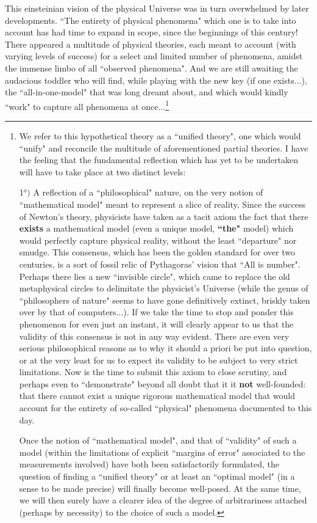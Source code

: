 This einsteinian vision of the physical Universe was in turn overwhelmed by later developments. ``The entirety of physical phenomena" which one is to take into account has had time to expand in scope, since the beginnings of this century! There appeared a multitude of physical theories, each meant to account (with varying levels of success) for a select and limited number of phenomena, amidst the immense limbo of all ``observed phenomena". And we are still awaiting the audacious toddler who will find, while playing with the new key (if one exists...), the ``all-in-one-model" that was long dreamt about, and which would kindly ``work" to capture all phenomena at once...\footnote{We refer to this hypothetical theory as a ``unified theory", one which would ``unify" and reconcile the multitude of aforementioned partial theories. I have the feeling that the fundamental reflection which has yet to be undertaken will have to take place at two distinct levels:

1$^o)$ A reflection of a ``philosophical" nature, on the very notion of ``mathematical model" meant to represent a slice of reality. Since the success of Newton's theory, physicists have taken as a tacit axiom the fact that there \textbf{exists} a mathematical model (even a unique model, \textbf{``the"} model) which would perfectly capture physical reality, without the least ``departure" nor smudge. This consensus, which has been the golden standard for over two centuries, is a sort of fossil relic of Pythagoras' vision that ``All is number". Perhaps there lies a new ``invisible circle", which came to replace the old metaphysical circles to delimitate the physicist's Universe (while the genus of ``philosophers of nature" seems to have gone definitively extinct, briskly taken over by that of computers...). If we take the time to stop and ponder this phenomenon for even just an instant, it will clearly appear to us that the validity of this consensus is not in any way evident. There are even very serious philosophical reasons as to why it should a priori be put into question, or at the very least for us to expect its validity to be subject to very strict limitations. Now is the time to submit this axiom to close scrutiny, and perhaps even to ``demonstrate" beyond all doubt that it it \textbf{not} well-founded: that there cannot exist a unique rigorous mathematical model that would account for the entirety of so-called ``physical" phenomena documented to this day. 

Once the notion of ``mathematical model", and that of ``validity" of such a model (within the limitations of explicit ``margins of error" associated to the measurements involved) have both been satisfactorily formulated, the question of finding a ``unified theory" or at least an ``optimal model" (in a sense to be made precise) will finally become well-posed. At the same time, we will then surely have a clearer idea of the degree of arbitrariness attached (perhaps by necessity) to the choice of such a model.

}
